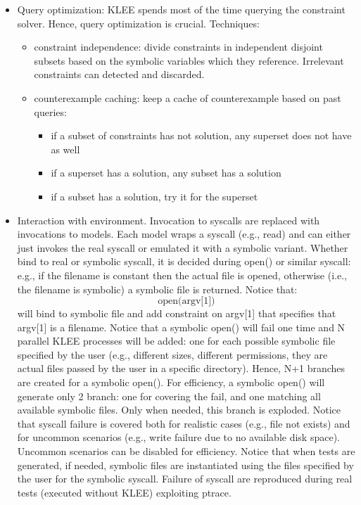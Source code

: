 \documentclass[10pt, a4paper]{article}
\begin{document}
\begin{itemize}
  \item Query optimization: KLEE spends most of the time querying the constraint solver. Hence, query optimization is crucial. Techniques:
    \begin{itemize}
      \item constraint independence: divide constraints in independent disjoint subsets based on the symbolic variables which they reference. Irrelevant constraints can detected and discarded.
      \item counterexample caching: keep a cache of counterexample based on past queries:
        \begin{itemize}
          \item if a subset of constraints has not solution, any superset does not have as well
          \item if a superset has a solution, any subset has a solution
          \item if a subset has a solution, try it for the superset
        \end{itemize}
    \end{itemize}
  \item Interaction with environment. Invocation to syscalls are replaced with invocations to models. Each model wraps a syscall (e.g., read) and can either just invokes the real syscall or emulated it with a symbolic variant. Whether bind to real or symbolic syscall, it is decided during open() or similar syscall: e.g., if the filename is constant then the actual file is opened, otherwise (i.e., the filename is symbolic) a symbolic file is returned. Notice that:
            \[ \text{open(argv[1])} \]
  will bind to symbolic file and add constraint on argv[1] that specifies that argv[1] is a filename. Notice that a symbolic open() will fail one time and N parallel KLEE processes will be added: one for each possible symbolic file specified by the user (e.g., different sizes, different permissions, they are actual files passed by the user in a specific directory). Hence, N+1 branches are created for a symbolic open(). For efficiency, a symbolic open() will generate only 2 branch: one for covering the fail, and one matching all available symbolic files. Only when needed, this branch is exploded. Notice that syscall failure is covered both for realistic cases (e.g., file not exists) and for uncommon scenarios (e.g., write failure due to no available disk space). Uncommon scenarios can be disabled for efficiency. Notice that when tests are generated, if needed, symbolic files are instantiated using the files specified by the user for the symbolic syscall. Failure of syscall are reproduced during real tests (executed without KLEE) exploiting ptrace.

\end{itemize}
\end{document}
